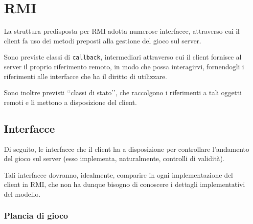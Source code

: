 \documentclass[a4paper,11pt]{article} %
\begin{document}
    \newpage


    \section{RMI}\label{sec:rmi}

    La struttura predisposta per RMI adotta numerose interfacce, attraverso cui il client fa uso dei metodi preposti alla gestione del gioco sul server.

    \smallskip

    Sono previste classi di \texttt{callback}, intermediari attraverso cui il client fornisce al server il proprio riferimento remoto, in modo che possa interagirvi,
    fornendogli i riferimenti alle interfacce che ha il diritto di utilizzare.

    \smallskip

    Sono inoltre previsti ‘‘classi di stato’’, che raccolgono i riferimenti a tali oggetti remoti e li mettono a disposizione del client.

    \subsection{Interfacce}\label{subsec:interfacce}

    Di seguito, le interfacce che il client ha a disposizione per controllare l'andamento del gioco sul server (esso implementa, naturalmente, controlli di validità).

    Tali interfacce dovranno, idealmente, comparire in ogni implementazione del client in RMI, che non ha dunque bisogno di conoscere i dettagli implementativi del modello.

    \subsubsection{Plancia di gioco}
\end{document}
